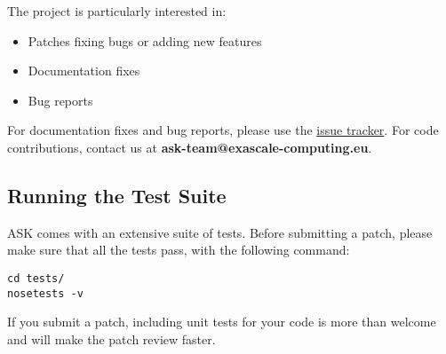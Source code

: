 The project is particularly interested in:
\begin{itemize}
	\item Patches fixing bugs or adding new features
	\item Documentation fixes
	\item Bug reports
\end{itemize}

For documentation fixes and bug reports, please use the \href{http://code.google.com/p/adaptive-sampling-kit/issues/list}{issue tracker}.
For code contributions, contact us at \textbf{ask-team@exascale-computing.eu}.

\subsection{Running the Test Suite}

ASK comes with an extensive suite of tests. Before submitting a patch, please make sure that all the tests pass, with the following command:
\begin{verbatim}
cd tests/
nosetests -v
\end{verbatim}

If you submit a patch, including unit tests for your code is more than welcome and will make the patch review faster.
